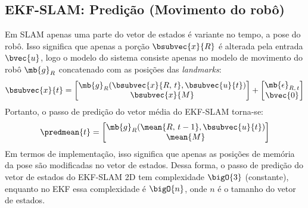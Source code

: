 \subsection{EKF-SLAM: Predição (Movimento do robô)}
\label{sec:ekf-slam-prediction}
Em SLAM apenas uma parte do vetor de estados é variante no tempo, a pose do 
robô. Isso significa que apenas a porção $\bsubvec{x}{R}$ é alterada pela entrada $\bvec{u}$, logo o modelo do sistema consiste apenas no modelo de 
movimento do robô $\mb{g}_R$ concatenado com as posições das \textit{landmarks}:
\begin{equation}
  \bsubvec{x}{t} = \begin{bmatrix}
    \mb{g}_R(\bsubvec{x}{R, \,t}, \bsubvec{u}{t}) \\
    \bsubvec{x}{M}
  \end{bmatrix} + \begin{bmatrix} 
      \mb{\epsilon}_{R, \,t} \\
      \bvec{0}
  \end{bmatrix}
  \label{eq:slam-prediction}
\end{equation}
Portanto, o passo de predição do vetor média do EKF-SLAM torna-se:
\begin{equation}
  \predmean{t} = \begin{bmatrix}
    \mb{g}_R(\mean{R, \,t-1}, \bsubvec{u}{t}) \\
      \mean{M}
  \end{bmatrix}
\end{equation}
Em termos de implementação, isso significa que apenas as posições de memória da 
pose são modificadas no vetor de estados. Dessa forma, o passo de predição do 
vetor de estados do EKF-SLAM 2D tem complexidade $\bigO{3}$ (constante), enquanto no EKF 
essa complexidade é $\bigO{n}$, onde $n$ é o tamanho do vetor de estados.

